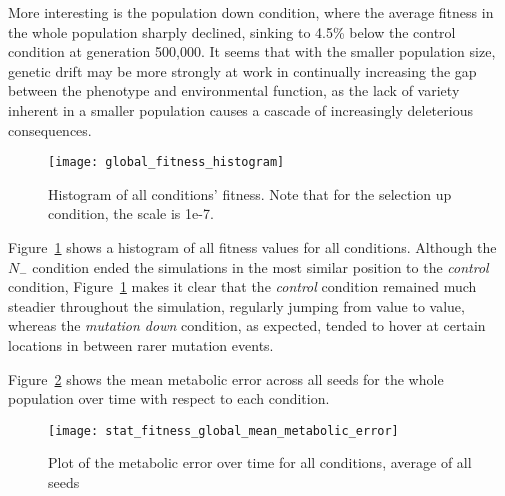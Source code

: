 More interesting is the population down condition, where the average fitness in the whole population sharply declined, sinking to 4.5\% below the control condition at generation 500,000. It seems that with the smaller population size, genetic drift may be more strongly at work in continually increasing the gap between the phenotype and environmental function, as the lack of variety inherent in a smaller population causes a cascade of increasingly deleterious consequences. 

\begin{figure}[H]
	\texttt{[image: global\_fitness\_histogram]}
	\caption[Mean fitness histogram]{Histogram of all conditions' fitness. Note that for the selection up condition, the scale is 1e-7. }
	\label{fig:global_fitness_histogram}
\end{figure}
Figure~\ref{fig:global_fitness_histogram} shows a histogram of all fitness values for all conditions. Although the $N_-$ condition ended the simulations in the most similar position to the \textit{control} condition, Figure~\ref{fig:global_fitness_histogram} makes it clear that the \textit{control} condition remained much steadier throughout the simulation, regularly jumping from value to value, whereas the \textit{mutation down} condition, as expected, tended to hover at certain locations in between rarer mutation events. 

Figure~\ref{fig:mean_metabolic_error} shows the mean metabolic error across all seeds for the whole population over time with respect to each condition. 
\begin{figure}[H]
	\texttt{[image: stat\_fitness\_global\_mean\_metabolic\_error]}
	\caption[Metabolic error]{Plot of the metabolic error over time for all conditions, average of all seeds}
	\label{fig:mean_metabolic_error}
\end{figure}

